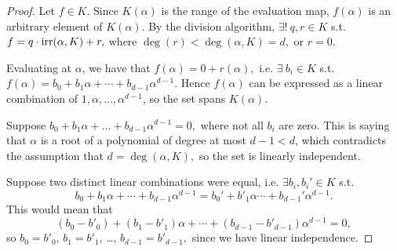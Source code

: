\begin{proof}
     Let $f \in K$. Since $K(\alpha)$ is the range of the evaluation map, $f(\alpha)$ is an arbitrary element of $K(\alpha)$. By the division algorithm, $\exists ! \: q,r \in K$ s.t. $f = q \cdot \operatorname{irr}(\alpha, K) + r,$ where $\deg(r) < \deg(\alpha, K) = d,$ or $r = 0.$
    

   Evaluating at $\alpha$, we have that $f(\alpha) = 0 + r(\alpha),$ i.e. $\exists \: b_i \in K$ s.t. $f(\alpha) = b_0+b_1\alpha +\cdots + b_{d-1}\alpha^{d-1}.$ Hence $f(\alpha)$ can be expressed as a linear combination of $1,\alpha, \ldots,\alpha^{d-1}$, so the set spans $K(\alpha)$.

   Suppose $b_0 + b_1\alpha + \ldots + b_{d-1}\alpha^{d-1} = 0,$ where not all $b_i$ are zero. This is saying that $\alpha$ is a root of a polynomial of degree at most $d-1 < d$, which contradicts the assumption that $d = \deg(\alpha, K),$ so the set is linearly independent.

   Suppose two distinct linear combinations were equal, i.e. $\exists b_i,b_i'\in K$ s.t. 
   $$b_0+b_1\alpha+\cdots+b_{d-1}\alpha^{d-1}=b_0'+b'_1\alpha \cdots+b_{d-1}'\alpha^{d-1}.$$
   This would mean that
   $$(b_0-b'_0)+(b_1-b'_1)\alpha+\cdots+(b_{d-1}-b'_{d-1})\alpha ^{d-1} =0,$$
   so $b_0=b'_0$, $b_1=b'_1$, \ldots, $b_{d-1}=b'_{d-1},$ since we have linear independence.
\end{proof}
